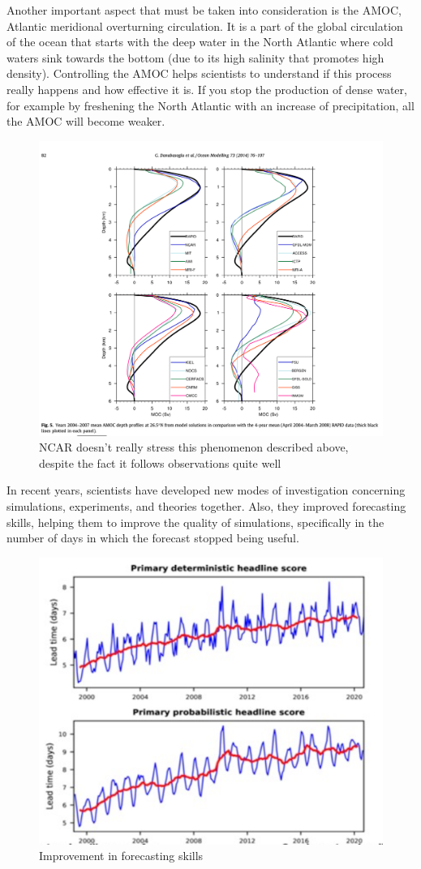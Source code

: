 Another important aspect that must be taken into consideration is the AMOC, Atlantic meridional overturning circulation. It is a part of the global circulation of the ocean that starts with the deep water in the North Atlantic where cold waters sink towards the bottom (due to its high salinity that promotes high density). 
Controlling the AMOC helps scientists to understand if this process really happens and how effective it is. 
If you stop the production of dense water, for example by freshening the North Atlantic with an increase of precipitation, all the AMOC will become weaker. 

\begin{figure}[h!]
    \centering
    \includegraphics[width=0.5\linewidth]{uploads/image3.png}
    \caption{NCAR doesn't really stress this phenomenon described above, despite the fact it follows observations quite well}
    \label{fig:enter-label}
\end{figure}

In recent years, scientists have developed new modes of investigation concerning simulations, experiments, and theories together. Also, they improved forecasting skills, helping them to improve the quality of simulations, specifically in the number of days in which the forecast stopped being useful. 
\begin{figure}[h!]
    \centering
    \includegraphics[width=0.5\linewidth]{uploads/image5.png}
    \caption{Improvement in forecasting skills}
    \label{fig:enter-label}
\end{figure}

